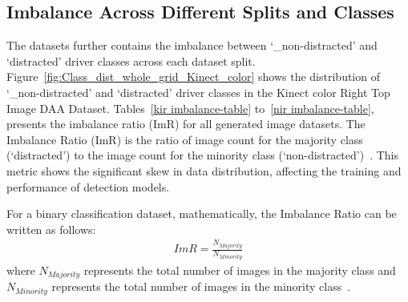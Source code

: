 \subsection{Imbalance Across Different Splits and Classes}

The datasets further contains the imbalance between `\_non-distracted' and `distracted' driver classes across each dataset split. Figure~\ref{fig:Class_dist_whole_grid_Kinect_color} shows the distribution of `\_non-distracted' and `distracted' driver classes in the Kinect color Right Top Image DAA Dataset. Tables~\ref{kir imbalance-table} to~\ref{nir imbalance-table}, presents the imbalance ratio (ImR) for all generated image datasets. The Imbalance Ratio (ImR) is the ratio of image count for the majority class (`distracted') to the image count for the minority class (`non-distracted')~\citep{Survey_DL_Taghi_article, 23_ImR_buda2018systematic}. This metric shows the significant skew in data distribution, affecting the training and performance of detection models.

For a binary classification dataset, mathematically, the Imbalance Ratio can be written as follows:
\begin{equation}
\begin{aligned}
ImR = \frac{N_{Majority}}{N_{Minority}}
\end{aligned}
\label{equation:4.4}
\end{equation}
where \(N_{Majority}\) represents the total number of images in the majority class and \(N_{Minority}\) represents the total number of images in the minority class~\citep{Survey_DL_Taghi_article, 23_ImR_buda2018systematic}.

